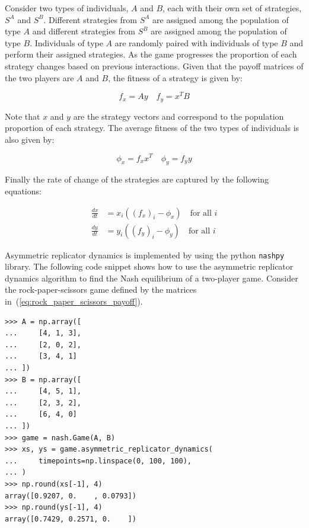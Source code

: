 Consider two types of individuals, \(A\) and \(B\), each with their own set of
strategies, \(S^A\) and \(S^B\).
Different strategies from \(S^A\) are assigned among the population of type
\(A\) and different strategies from \(S^B\) are assigned among the population
of type \(B\).
Individuals of type \(A\) are randomly paired with individuals of type \(B\)
and perform their assigned strategies.
As the game progresses the proportion of each strategy changes based on previous
interactions.
Given that the payoff matrices of the two players are \(A\) and \(B\), the
fitness of a strategy is given by:

\begin{equation}\label{eq:fitness_definition}
    f_x = A y \quad f_y = x^T B
\end{equation}

Note that \(x\) and \(y\) are the strategy vectors and correspond to the
population proportion of each strategy.
The average fitness of the two types of individuals is also given by:

\begin{equation}\label{eq:average_fitness_definition}
    \phi_x = f_x x^T \quad \phi_y = f_y y
\end{equation}

Finally the rate of change of the strategies are captured by the following
equations:

\begin{align}\label{eq:replicator_dynamics}
    \frac{dx}{dt} &= x_i((f_x)_i - \phi_x) \quad \text{for all } i \\
    \frac{dy}{dt} &= y_i((f_y)_i - \phi_y) \quad \text{for all } i
\end{align}

Asymmetric replicator dynamics is implemented by using the python
\lstinline[style=pystyle]{nashpy} library.
The following code snippet shows how to use the asymmetric replicator dynamics
algorithm to find the Nash equilibrium of a two-player game.
Consider the rock-paper-scissors game defined by the matrices
in~(\ref{eq:rock_paper_scissors_payoff}).

\begin{lstlisting}[style=pystyle]
>>> A = np.array([
...     [4, 1, 3],
...     [2, 0, 2],
...     [3, 4, 1]
... ])
>>> B = np.array([
...     [4, 5, 1],
...     [2, 3, 2],
...     [6, 4, 0]
... ])
>>> game = nash.Game(A, B)
>>> xs, ys = game.asymmetric_replicator_dynamics(
...     timepoints=np.linspace(0, 100, 100),
... )
>>> np.round(xs[-1], 4)
array([0.9207, 0.    , 0.0793])
>>> np.round(ys[-1], 4)
array([0.7429, 0.2571, 0.    ])

\end{lstlisting}

